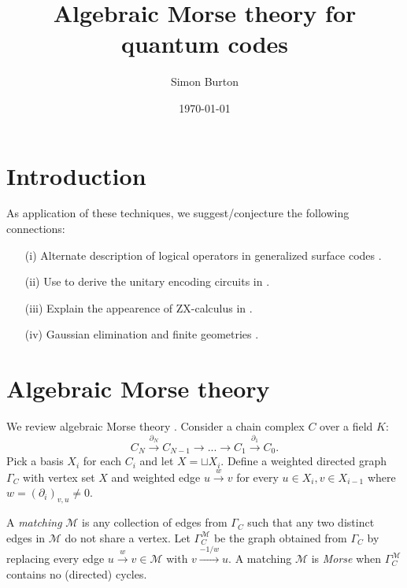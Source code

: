\documentclass[11pt,oneside]{article}
\title{Algebraic Morse theory for quantum codes}
\author{Simon Burton}
\date{\today}
\newcommand{\MM}{\mathcal{M}}
\begin{document}
\maketitle

\section{Introduction}

As application of these techniques, we suggest/conjecture the following connections:
\begin{enumerate}
\item[(i)]
Alternate description of logical operators in
generalized surface codes \cite{Delfosse2016}.
\item[(ii)]
Use to derive the unitary encoding circuits in \cite{Higgott2020}.
\item[(iii)]
Explain the appearence of ZX-calculus in \cite{deBeaudrap2020}.
\item[(iv)]
Gaussian elimination and finite geometries \cite{Rengaswamy2018}.
\end{enumerate}


\section{Algebraic Morse theory}

We review algebraic Morse theory 
\cite{Jollenbeck2005,Kozlov2005,Skoldberg2006}.
Consider a chain complex $C$ over a field $K$:
$$
    C_N \xrightarrow{\partial_N} C_{N-1}
    \to ...
    \to C_1 \xrightarrow{\partial_1} C_0.
$$
Pick a basis $X_i$ for each $C_i$
and let $X=\sqcup X_i$.
Define a weighted directed graph $\Gamma_C$
with vertex set $X$ and
weighted edge $u\xrightarrow{w}v$
for every $u\in X_i, v\in X_{i-1}$
where $w = (\partial_i)_{v,u} \ne 0.$

A {\it matching} $\MM$ is any collection of
edges from $\Gamma_C$ such that 
any two distinct edges in $\MM$ do not share a vertex.
Let $\Gamma_C^\MM$ be the graph obtained from
$\Gamma_C$ by replacing every edge $u\xrightarrow{w} v\in \MM$
with $v\xrightarrow{-1/w} u.$
A matching $\MM$ is {\it Morse} when
$\Gamma_C^\MM$ contains no (directed) cycles.
\end{document}
